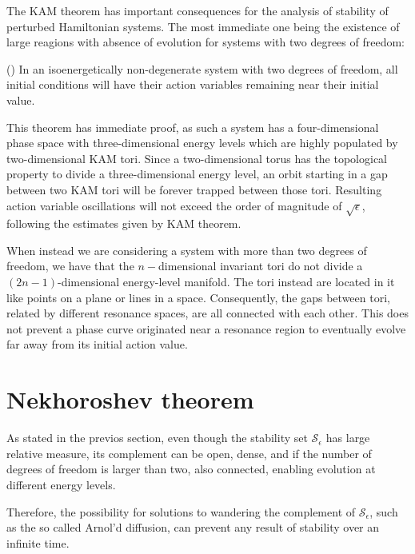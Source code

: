 The KAM theorem has important consequences for the analysis of stability of perturbed Hamiltonian systems. The most immediate one being the existence of large reagions with absence of evolution for systems with two degrees of freedom:
\begin{theorem}(\cite{})
    In an isoenergetically non-degenerate system with two degrees of freedom, all initial conditions will have their action variables remaining near their initial value.
\end{theorem} 
This theorem has immediate proof, as such a system has a four-dimensional phase space with three-dimensional energy levels which are highly populated by two-dimensional KAM tori. Since a two-dimensional torus has the topological property to divide a three-dimensional energy level, an orbit starting in a gap between two KAM tori will be forever trapped between those tori. Resulting action variable oscillations will not exceed the order of magnitude of $\sqrt{\epsilon}$, following the estimates given by KAM theorem. 

When instead we are considering a system with more than two degrees of freedom, we have that the $n-$dimensional invariant tori do not divide a $(2n-1)$-dimensional energy-level manifold. The tori instead are located in it like points on a plane or lines in a space. Consequently, the gaps between tori, related by different resonance spaces, are all connected with each other. This does not prevent a phase curve originated near a resonance region to eventually evolve far away from its initial action value. 

\section{Nekhoroshev theorem}\label{sec:1:nekhoroshev}

As stated in the previos section, even though the stability set $\mathcal{S}_\epsilon$ has large relative measure, its complement can be open, dense, and if the number of degrees of freedom is larger than two, also connected, enabling evolution at different energy levels.

Therefore, the possibility for solutions to wandering the complement of $\mathcal{S}_\epsilon$, such as the so called Arnol’d diffusion, can prevent any result of stability over an infinite time.


